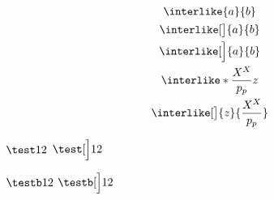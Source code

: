 \documentclass[12pt, a4paper]{article}
\begin{document}
\begin{gather*}
\interlike{a}{b} \\
\interlike[\big]{a}{b} \\
\interlike[\Big]{a}{b} \\
\interlike*{\frac{X^X}{p_p}}{z} \\
\interlike[\big]{z}{\frac{X^X}{p_p}}
\end{gather*}

$\test12$
$\test[\Big]12$

$\testb12$
$\testb[\Big]12$
\end{document}
